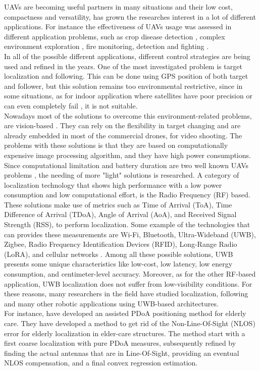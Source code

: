 UAVs are becoming useful partners in many situations and their low cost, compactness and versatility, has grown the researches interest in a lot of different applications. For instance the effectiveness of UAVs usage was assessed in different application problems, such as crop disease detection \cite{cropdisdect}, complex environment exploration \cite{complenvexp}, fire monitoring, detection and fighting \cite{FireUAV}.\\
In all of the possible different applications, different control strategies are being used and refined in the years. One of the most investigated problem is target localization and following. This can be done using GPS position of both target and follower, but this solution remains too environmental restrictive, since in some situations, as for indoor application where satellites have poor precision or can even completely fail \cite{GPS-denied}, it is not suitable.\\
Nowadays most of the solutions to overcome this environment-related problems, are vision-based \cite{visualinertialrev}. They can rely on the flexibility in target changing and are already embedded in most of the commercial drones, for video shooting. The problems with these solutions is that they are based on computationally expensive image processing algorithm, and they have high power consumptions. Since computational limitation and battery duration are two well known UAVs problems \cite{UAVlimits}, the needing of more "light" solutions is researched.
A category of localization technology that shows high performance with a low power consumption and low computational effort, is the Radio Frequency (RF) based. These solutions make use of metrics such as Time of Arrival (ToA), Time Difference of Arrival (TDoA), Angle of Arrival (AoA), and Received Signal Strength (RSS), to perform localization. Some example of the technologies that can provides these measurements are Wi-Fi, Bluetooth, Ultra-Wideband (UWB), Zigbee, Radio Frequency Identification Devices (RFID), Long-Range Radio (LoRA), and cellular networks \cite{radiofreqloc}. Among all these possible solutions, UWB presents some unique characteristics like low-cost, low latency, low energy consumption, and centimeter-level accuracy. Moreover, as for the other RF-based application, UWB localization does not suffer from low-visibility conditions. For these reasons, many researchers in the field have studied localization, following and many other robotic applications using UWB-based architectures.\\
For instance, \citet{elderlycare} have developed an assisted PDoA positioning method for elderly care. They have developed a method to get rid of the Non-Line-Of-Sight (NLOS) error for elderly localization in elder-care structures. The method start with a first coarse localization with pure PDoA measures, subsequently refined by finding the actual antennas that are in Line-Of-Sight, providing an eventual NLOS compensation, and a final convex regression estimation.\\
